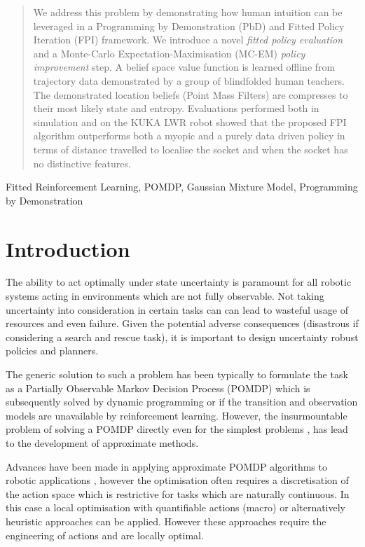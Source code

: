 \documentclass[final,5p,times,twocolumn]{elsarticle}
\begin{document}
\begin{frontmatter}
\begin{abstract}
We address this problem by demonstrating how human intuition can be leveraged in a Programming by Demonstration (PbD) and 
Fitted Policy Iteration (FPI) framework. We introduce a novel \textit{fitted policy evaluation} and a Monte-Carlo 
Expectation-Maximisation (MC-EM) \textit{policy improvement} step. A belief space value function is learned offline from 
trajectory data demonstrated by a group of blindfolded human teachers. The demonstrated location beliefs (Point Mass Filters) 
are compresses to their most likely state and entropy. Evaluations performed both in simulation and on 
the KUKA LWR robot showed that the proposed FPI algorithm outperforms both a myopic and a purely data driven 
policy in terms of distance travelled to localise the socket and when the socket has no distinctive features.

\end{abstract}

\begin{keyword} 
Fitted Reinforcement Learning, POMDP, Gaussian Mixture Model, Programming by Demonstration
\end{keyword}

\end{frontmatter}

\section{Introduction}

The ability to act optimally under state uncertainty is paramount for all robotic systems acting in 
environments which are not fully observable. Not taking uncertainty into consideration in certain 
tasks can can lead to wasteful usage of resources and even failure. Given the potential adverse 
consequences (disastrous if considering a search and rescue task), it is important to design 
uncertainty robust policies and planners.

The generic solution to such a problem has been typically to formulate the task as a
Partially Observable Markov Decision Process (POMDP) which is subsequently solved by dynamic programming
or if the transition and observation models are unavailable by reinforcement learning. 
However, the insurmountable problem of solving a POMDP directly even for the simplest problems \cite{PBVI_2003}, 
has lead to the development of approximate methods. 

Advances have been made in applying approximate POMDP algorithms to robotic applications
\cite{pomdp_peg_icra_2014}, however the optimisation often requires a discretisation of the 
action space which is restrictive for tasks which are naturally continuous. In this case
a local optimisation with quantifiable actions (macro) \cite{toussain_2015} or alternatively heuristic 
approaches \cite{Lauri2016} can be applied. However these approaches require the engineering 
of actions and are locally optimal. 
\end{document}
